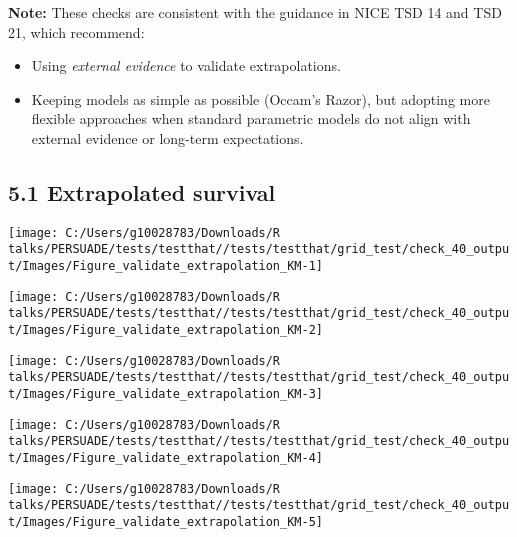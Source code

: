 \documentclass[
]{article}
\providecommand{\tightlist}{%
  \setlength{\itemsep}{0pt}\setlength{\parskip}{0pt}}
\begin{document}
\textbf{Note:} These checks are consistent with the guidance in NICE TSD
14 and TSD 21, which recommend:

\begin{itemize}
\tightlist
\item
  Using \emph{external evidence} to validate extrapolations.\\
\item
  Keeping models as simple as possible (Occam's Razor), but adopting
  more flexible approaches when standard parametric models do not align
  with external evidence or long-term expectations.
\end{itemize}

\subsection{5.1 Extrapolated survival}\label{extrapolated-survival}

\begin{flushleft}\texttt{[image: C:/Users/g10028783/Downloads/R talks/PERSUADE/tests/testthat//tests/testthat/grid\_test/check\_40\_output/Images/Figure\_validate\_extrapolation\_KM-1]} \end{flushleft}

\begin{flushleft}\texttt{[image: C:/Users/g10028783/Downloads/R talks/PERSUADE/tests/testthat//tests/testthat/grid\_test/check\_40\_output/Images/Figure\_validate\_extrapolation\_KM-2]} \end{flushleft}

\begin{flushleft}\texttt{[image: C:/Users/g10028783/Downloads/R talks/PERSUADE/tests/testthat//tests/testthat/grid\_test/check\_40\_output/Images/Figure\_validate\_extrapolation\_KM-3]} \end{flushleft}

\begin{flushleft}\texttt{[image: C:/Users/g10028783/Downloads/R talks/PERSUADE/tests/testthat//tests/testthat/grid\_test/check\_40\_output/Images/Figure\_validate\_extrapolation\_KM-4]} \end{flushleft}

\begin{flushleft}\texttt{[image: C:/Users/g10028783/Downloads/R talks/PERSUADE/tests/testthat//tests/testthat/grid\_test/check\_40\_output/Images/Figure\_validate\_extrapolation\_KM-5]} \end{flushleft}
\end{document}
